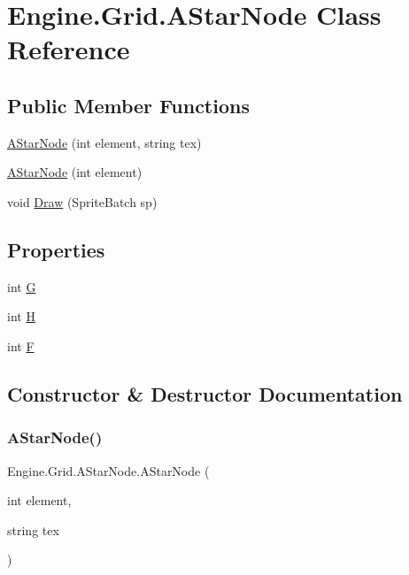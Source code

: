 \hypertarget{a00402}{}\section{Engine.\+Grid.\+A\+Star\+Node Class Reference}
\label{a00402}
\subsection*{Public Member Functions}
\begin{DoxyCompactItemize}
\item 
\hyperlink{a00402_a7a3c8e3fd948f9d8cc3b54785ee158fd}{A\+Star\+Node} (int element, string tex)
\item 
\hyperlink{a00402_aa1178655cad381caac040bf8da0a31e0}{A\+Star\+Node} (int element)
\item 
void \hyperlink{a00402_a466f4f5a7adfb5bfcacc1289c777c477}{Draw} (Sprite\+Batch sp)
\end{DoxyCompactItemize}
\subsection*{Properties}
\begin{DoxyCompactItemize}
\item 
int \hyperlink{a00402_a6579e5c7fd60346c98cead260791ad77}{G}
\item 
int \hyperlink{a00402_ac65eea2ee92b33d7afde19dc0b94dbea}{H}
\item 
int \hyperlink{a00402_aab3ff45feb87f3f6f86bbc6ba1661fb8}{F}
\end{DoxyCompactItemize}


\subsection{Constructor \& Destructor Documentation}
\mbox{\label{a00402_a7a3c8e3fd948f9d8cc3b54785ee158fd}} 
\subsubsection{\texorpdfstring{A\+Star\+Node()}{AStarNode()}\hspace{0.1cm}{\footnotesize\ttfamily [1/2]}}
{\footnotesize\ttfamily Engine.\+Grid.\+A\+Star\+Node.\+A\+Star\+Node (\begin{DoxyParamCaption}\item[{int}]{element,  }\item[{string}]{tex }\end{DoxyParamCaption})\hspace{0.3cm}{\ttfamily [inline]}}


